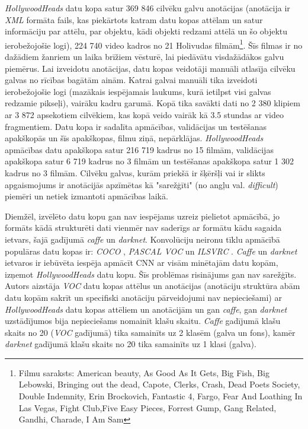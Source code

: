 \textit{HollywoodHeads} datu kopa satur 369 846 cilvēku galvu anotācijas (anotācija ir \textit{XML} formāta fails, kas piekārtots katram datu kopas attēlam un satur informāciju par attēlu, par objektu, kādi objekti redzami attēlā un šo objektu ierobežojošie logi), 224 740 video kadros no 21 Holivudas filmām\footnote{Filmu saraksts: American beauty, As Good As It Gets, Big Fish, Big Lebowski, Bringing out the
dead, Capote, Clerks, Crash, Dead Poets Society, Double Indemnity, Erin
Brockovich, Fantastic 4, Fargo, Fear And Loathing In Las Vegas, Fight	Club,Five Easy Pieces, Forrest Gump, Gang Related, Gandhi, Charade, I Am Sam}. Šīs filmas ir no dažādiem žanriem un laika brīžiem vēsturē, lai piedāvātu visdažādākos galvu piemērus. Lai izveidotu anotācijas, datu kopas veidotāji manuāli atlasīja cilvēku galvas no rīcības bagātām ainām. Katrai galvai manuāli tika izveidoti ierobežojošie logi (mazākais iespējamais laukums, kurā ietilpst visi galvas redzamie pikseļi), vairāku kadru garumā. Kopā tika savākti dati no 2 380 klipiem ar 3 872 apsekotiem cilvēkiem, kas kopā veido vairāk kā 3.5 stundas ar video fragmentiem. Datu kopa ir sadalīta apmācības, validācijas un testēšanas apakškopās un šīs apakškopas, filmu ziņā, nepārklājas. \textit{HollywoodHeads} apmācības datu apakškopa satur 216 719 kadrus no 15 filmām, validācijas apakškopa satur 6 719 kadrus no 3 filmām un testēšanas apakškopa satur 1 302 kadrus no 3 filmām. Cilvēku galvas, kurām priekšā ir šķēršļi vai ir slikts apgaismojums ir anotācijās apzīmētas kā "sarežģīti" (no angļu val. \textit{difficult}) piemēri un netiek izmantoti apmācības laikā. 

Diemžēl, izvēlēto datu kopu gan nav iespējams uzreiz pielietot apmācībā, jo formāts kādā strukturēti dati vienmēr nav saderīgs ar formātu kādu sagaida ietvars, šajā gadījumā \textit{caffe} un \textit{darknet}. Konvolūciju neironu tīklu apmācībā populāras datu kopas ir: \textit{COCO} \cite{lin2014microsoft}, \textit{PASCAL VOC} \cite{everingham2010pascal} un \textit{ILSVRC} \cite{ILSVRC15}. \textit{Caffe} un \textit{darknet} ietvaros ir iebūvēta iespēja apmācīt CNN ar visām minētajām datu kopām, izņemot \textit{HollywoodHeads} datu kopu. Šīs problēmas risinājums gan nav sarežģīts. Autors aizstāja \textit{VOC} datu kopas attēlus un anotācijas (anotāciju struktūra abām datu kopām sakrīt un specifiski anotāciju pārveidojumi nav nepieciešami) ar \textit{HollywoodHeads} datu kopas attēliem un anotācijām un gan \textit{caffe}, gan \textit{darknet} uzstādījumos bija nepieciešams nomainīt klašu skaitu. \textit{Caffe} gadījumā klašu skaits no 20 (\textit{VOC} gadījumā) tika samainīts uz 2 klasēm (galva un fons), kamēr \textit{darknet} gadījumā klašu skaits no 20 tika samainīts uz 1 klasi (galva).

